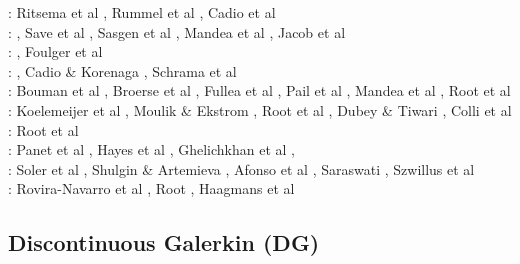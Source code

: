 \begin{scriptsize}
\twothousandeleven: Ritsema et al \cite{ridv11}, Rummel et al \cite{ruys11}, Cadio et al \cite{capd11}\\
\twothousandtwelve: \cite{hawj12}\cite{resa12}\cite{hawj12}\cite{fesw12}\cite{simj12}\cite{beck12}\cite{pahk12}, Save et al \cite{sabt12}, Sasgen et al \cite{sakm12}, Mandea et al \cite{mapl12}, Jacob et al \cite{jawp12}\\
\twothousandthirteen: \cite{ress13}\cite{ebbf13}\cite{davi13}\cite{scle13}\cite{waja13}, Foulger et al \cite{fopa13}\\
\twothousandfourteen: \cite{paml14}\cite{ebbf14}\cite{krbk14}\cite{licl14}\cite{aubb14}, 
Cadio \& Korenaga \cite{cako14}, Schrama et al \cite{scwr14}\\
\twothousandfifteen: Bouman et al \cite{boem15}, Broerse et al \cite{brrs15}, Fullea et al \cite{furc15}, Pail et al \cite{pabb15},
Mandea et al \cite{manp15}, Root et al \cite{rotv15}\\
\twothousandsixteen: Koelemeijer et al \cite{kord16}, Moulik \& Ekstrom \cite{moek16}, Root et al \cite{rond16}, 
Dubey \& Tiwari \cite{duti16}, Colli et al \cite{cogb16}\\
\twothousandseventeen: Root et al \cite{roev17}\\
\twothousandeighteen: Panet et al \cite{pabn18}, Hayes et al \cite{hamp18}, Ghelichkhan et al \cite{ghmc18}, \cite{homs18}\\
\twothousandnineteen: Soler et al \cite{sopg19}, Shulgin \& Artemieva \cite{shar19}, Afonso et al \cite{afss19}, 
Saraswati \cite{sacm19}, Szwillus et al \cite{szae19}\\
\twothousandtwenty: Rovira-Navarro et al \cite{rovb20}, Root \cite{root20}, Haagmans et al \cite{hasm20}
\end{scriptsize}

\subsection{Discontinuous Galerkin (DG)}

